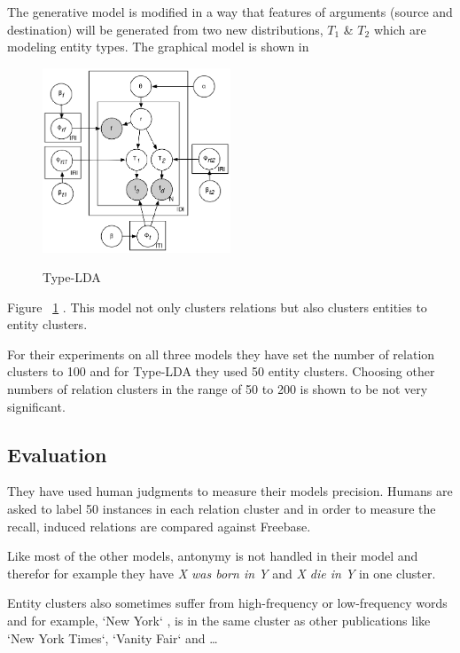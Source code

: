 \documentclass[12pt]{report}
\begin{document}
    The generative model is modified in a way that features of arguments (source and destination)
    will be generated from two new distributions, $T_1$ \& $T_2$ which are modeling entity types. The graphical model
    is shown in
     \begin{figure}[h!]
  \caption{Type-LDA}
  \centering
    \includegraphics[width=0.5\textwidth]{type-lda.eps}
    \label{fig:type-lda}
\end{figure} 
Figure ~\ref{fig:type-lda} .
    This model not only clusters relations but also clusters entities to entity clusters.
    
    For their experiments on all three models they have set the number of relation clusters to 100 and for Type-LDA they used 
     50 entity clusters. Choosing other numbers of relation clusters in the range of 50 to 200 is shown to be not very significant.
    
\subsection {Evaluation}
\label{ch:evaluation}

They have used human judgments 
 to measure their models precision. Humans are asked to label 50 instances in each relation cluster and in order to measure
 the recall, induced relations are compared against Freebase. 
 
 Like most of the other models, antonymy is not handled in their model and therefor for example they have
 \emph{X was born in Y} and \emph{X die in Y} in one cluster.
 
 Entity clusters also sometimes suffer from high-frequency or low-frequency words and for example, `New York`
 , is in the same cluster as other publications like `New York Times`, `Vanity Fair` and \ldots
 
\end{document}
